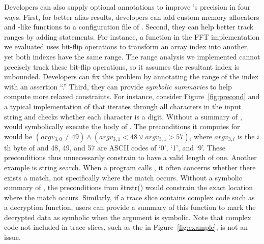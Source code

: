 Developers can also supply optional annotations to improve \peregrine's
precision in four ways.  First, for better alias results, developers can
add custom memory allocators and -like functions to a
configuration file of \peregrine.  Second, they can help \peregrine better track
ranges by adding  statements.  For instance, a function in the
FFT implementation we evaluated uses bit-flip operations to transform an
array index into another, yet both indexes have the same range.  The range
analysis we implemented cannot precisely track these bit-flip operations,
so it assumes the resultant index is unbounded.  Developers can fix this
problem by annotating the range of the index with an assertion
``.''  Third, they can provide \emph{symbolic
  summaries} to help \peregrine compute more relaxed constraints.  For instance,
consider Figure~\ref{fig:precond} and a typical implementation of
 that iterates through all characters in the input string and
checks whether each character is a digit.  Without a summary of ,
\peregrine would symbolically execute the body of .  The preconditions
it computes for  would be $ (argv_{3,0} \neq 49) \wedge
(argv_{3,1} < 48 \vee argv_{3,1} > 57)$, where $argv_{3,i}$ is the $i$th
byte of  and 48, 49, and 57 are ASCII codes of `0', `1', and
`9'.  These preconditions thus unnecessarily constrain  to
have a valid length of one.  Another example is string search.  When a
program calls , it often concerns whether there exists a
match, not specifically where the match occurs.  Without a symbolic
summary of , the preconditions from \v{strstr()} would
constrain the exact location where the match occurs.  Similarly, if a
trace slice contains complex code such as a decryption function, users can
provide a summary of this function to mark the decrypted data as symbolic
when the argument is symbolic.  Note that complex code not included in
trace slices, such as the  in Figure~\ref{fig:example}, is not an
issue.


